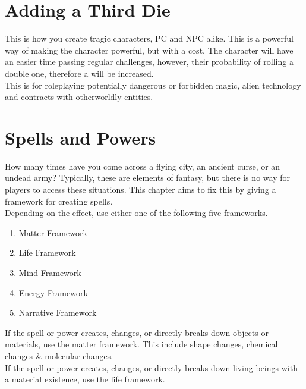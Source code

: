 \documentclass{LegrandOrangeTufteBook}
\begin{document}


\section*{Adding a Third Die}

This is how you create tragic characters, PC and NPC alike.
This is a powerful way of making the character powerful, but with a cost.
The character will have an easier time passing regular challenges,
however, their probability of rolling a double one, therefore a 
will be increased.\\

This is for roleplaying potentially dangerous or forbidden magic, alien technology and contracts with otherworldly entities.

\section*{Spells and Powers}

How many times have you come across a flying city, an ancient curse, or an
undead army? Typically, these are elements of fantasy, but there is no
way for players to access these situations. This chapter aims to fix
this by giving a framework for creating spells.\\

Depending on the effect, use either one of the following five frameworks.
\begin{enumerate}
	\item Matter Framework
	\item Life Framework
	\item Mind Framework
	\item Energy Framework
	\item Narrative Framework
\end{enumerate}

If the spell or power creates, changes, or directly breaks down objects or materials, use the matter framework.
This include shape changes, chemical changes \& molecular changes.\\

If the spell or power creates, changes, or directly breaks down living beings with a material existence, use the life framework.\\
\end{document}
